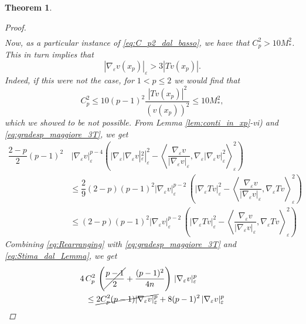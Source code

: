 \documentclass[10pt]{amsart}
\numberwithin{equation}{section}
\newtheorem{theorem}{Theorem}[section]
\theoremstyle{definition}
\begin{document}
\begin{theorem}
\begin{proof}
\begin{equation}
\begin{aligned}
			\end{aligned}
		\end{equation}
		Now, as a particular instance of \eqref{eq:C_p2_dal_basso}, we have that $C_p^2 > 10 M_{\ast}^{2}$. This in turn implies that 
		\begin{equation}\label{eq:gradesp_maggiore_3T}
			|\nabla_{\varepsilon}v(x_p)|_{\varepsilon} > 3 |Tv(x_p)|.
		\end{equation}
		Indeed, if this were not the case, for $1<p \leq 2$ we would find that
		\begin{equation*}
			C_{p}^{2} \leq 10 (p-1)^2 \dfrac{|Tv(x_p)|^2}{(v(x_p))^2} \leq 10 M_{\ast}^{2},
		\end{equation*}
		\noindent which we showed to be not possible.
		From Lemma \ref{lem:conti_in_xp}-vi) and \eqref{eq:gradesp_maggiore_3T}, we get
		\begin{equation}\label{eq:Stima_dal_Lemma}
			\begin{aligned}
				\dfrac{2-p}{2}(p-1)^{2} & \, |\nabla_{\varepsilon}v|_{\varepsilon}^{p-4} \left(|\nabla_{\varepsilon}|\nabla_{\varepsilon}v|_{\varepsilon}^2|^2_{\varepsilon} - \left\langle \dfrac{\nabla_{\varepsilon}v}{|\nabla_{\varepsilon}v|_{\varepsilon}}, \nabla_{\varepsilon}|\nabla_{\varepsilon}v|_{\varepsilon}^2 \right\rangle_{\varepsilon}^2\right)\\
				&\leq \dfrac{2}{9}(2-p)(p-1)^{2} |\nabla_{\varepsilon}v|_{\varepsilon}^{p-2} \, \left(|\nabla_{\varepsilon}T v|_{\varepsilon}^2 - \left\langle \dfrac{\nabla_{\varepsilon}v}{|\nabla_{\varepsilon}v|_{\varepsilon}}, \nabla_{\varepsilon}T v \right\rangle^{2}_{\varepsilon}\right)\\
				&\leq (2-p)(p-1)^{2} |\nabla_{\varepsilon}v|_{\varepsilon}^{p-2} \, \left(|\nabla_{\varepsilon}T v|_{\varepsilon}^2 - \left\langle \dfrac{\nabla_{\varepsilon}v}{|\nabla_{\varepsilon}v|_{\varepsilon}}, \nabla_{\varepsilon}T v \right\rangle^{2}_{\varepsilon}\right)
			\end{aligned}
		\end{equation}
		Combining \eqref{eq:Rearranging} with \eqref{eq:gradesp_maggiore_3T} and \eqref{eq:Stima_dal_Lemma}, we get
		\begin{equation}\label{eq:penultimo_conto}
			\begin{aligned}
				4\, &C_{p}^{2}\, \left(\cancel{\dfrac{p-1}{2}} + \dfrac{(p-1)^2}{4n}\right)\,  |\nabla_{\varepsilon}v|_{\varepsilon}^{p} \\
				&\leq \cancel{2C_p^2 (p-1)|\nabla_{\varepsilon}v|_{\varepsilon}^{p}} + 8(p-1)^2 \, |\nabla_{\varepsilon}v|_{\varepsilon}^{p}

\end{aligned}
\end{equation}
\end{proof}
\end{theorem}
\end{document}

